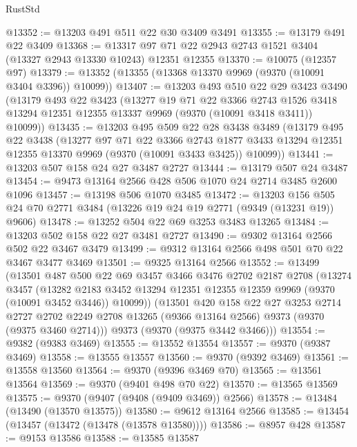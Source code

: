 \begin{lexlean}{RustStd}
\begin{coremodule}
@13352 := @13203 @491 @511 @22 @30 @3409 @3491
@13355 := @13179 @491 @22 @3409
@13368 := @13317 @97 @71 @22 @2943 @2743 @1521 @3404 (@13327 @2943 @13330 @10243) @12351 @12355
@13370 := @10075 (@12357 @97)
@13379 := @13352 (@13355 (@13368 @13370 @9969 (@9370 (@10091 @3404 @3396)) @10099))
@13407 := @13203
    @493
    @510
    @22
    @29
    @3423
    @3490
    (@13179
      @493
      @22
      @3423
      (@13277
        @19
        @71
        @22
        @3366
        @2743
        @1526
        @3418
        @13294
        @12351
        @12355
        @13337
        @9969
        (@9370 (@10091 @3418 @3411))
        @10099))
@13435 := @13203
    @495
    @509
    @22
    @28
    @3438
    @3489
    (@13179
      @495
      @22
      @3438
      (@13277
        @97
        @71
        @22
        @3366
        @2743
        @1877
        @3433
        @13294
        @12351
        @12355
        @13370
        @9969
        (@9370 (@10091 @3433 @3425))
        @10099))
@13441 := @13203 @507 @158 @24 @27 @3487 @2727
@13444 := @13179 @507 @24 @3487
@13454 := @9473 @13164 @2566 @428 @506 @1070 @24 @2714 @3485 @2600 @1096
@13457 := @13198 @506 @1070 @3485
@13472 := @13203 @156 @505 @24 @70 @2771 @3484 (@13226 @19 @24 @19 @2771 (@9349 (@13231 @19)) @9606)
@13478 := @13252 @504 @22 @69 @3253 @3483 @13265
@13484 := @13203 @502 @158 @22 @27 @3481 @2727
@13490 := @9302 @13164 @2566 @502 @22 @3467 @3479
@13499 := @9312 @13164 @2566 @498 @501 @70 @22 @3467 @3477 @3469
@13501 := @9325 @13164 @2566
@13552 := @13499
    (@13501
      @487
      @500
      @22
      @69
      @3457
      @3466
      @3476
      @2702
      @2187
      @2708
      (@13274
        @3457
        (@13282 @2183 @3452 @13294 @12351 @12355 @12359 @9969 (@9370 (@10091 @3452 @3446)) @10099))
      (@13501
        @420
        @158
        @22
        @27
        @3253
        @2714
        @2727
        @2702
        @2249
        @2708
        @13265
        (@9366 @13164 @2566)
        @9373
        (@9370 (@9375 @3460 @2714)))
      @9373
      (@9370 (@9375 @3442 @3466)))
@13554 := @9382 (@9383 @3469)
@13555 := @13552 @13554
@13557 := @9370 (@9387 @3469)
@13558 := @13555 @13557
@13560 := @9370 (@9392 @3469)
@13561 := @13558 @13560
@13564 := @9370 (@9396 @3469 @70)
@13565 := @13561 @13564
@13569 := @9370 (@9401 @498 @70 @22)
@13570 := @13565 @13569
@13575 := @9370 (@9407 (@9408 (@9409 @3469)) @2566)
@13578 := @13484 (@13490 (@13570 @13575))
@13580 := @9612 @13164 @2566
@13585 := @13454 (@13457 (@13472 (@13478 (@13578 @13580))))
@13586 := @8957 @428
@13587 := @9153 @13586
@13588 := @13585 @13587

\end{coremodule}
\end{lexlean}
